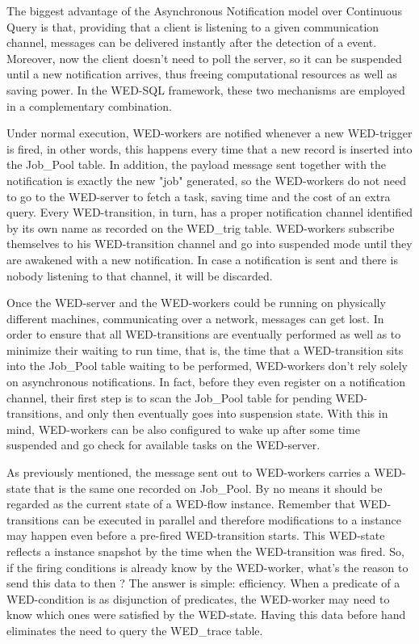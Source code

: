 \documentclass[12pt]{article}
\begin{document}
\par The biggest advantage of the Asynchronous Notification model over Continuous Query is that, providing that a client is 
listening to a given communication channel, messages can be delivered instantly after the detection of a event. Moreover,
now the client doesn't need to poll the server, so it can be suspended until a new notification arrives, thus freeing 
computational resources as well as saving power. In the WED-SQL framework, these two mechanisms are employed in a complementary
combination. 

\par Under normal execution, WED-workers are notified whenever a new WED-trigger is fired, in other words, this happens 
every time that a new record is inserted into the Job\_Pool table. In addition, the payload message sent together with
the notification is exactly the new "job" generated, so the WED-workers do not need to go to the WED-server to fetch a task,
saving time and the cost of an extra query. Every WED-transition, in turn, has a proper notification channel identified
by its own name as recorded on the WED\_trig table. WED-workers subscribe themselves to his WED-transition channel and 
go into suspended mode until they are awakened with a new notification. In case a notification is sent and there is nobody
listening to that channel, it will be discarded.  

\par Once the WED-server and the WED-workers could be running on physically different machines, communicating over a network, 
messages can get lost. In order to ensure that all WED-transitions are eventually performed as well as to minimize their waiting to run time,
that is, the time that a WED-transition sits into the Job\_Pool table waiting to be performed, WED-workers don't rely solely
on asynchronous notifications. In fact, before they even register on a notification channel, their first step is to scan
the Job\_Pool table for pending WED-transitions, and only then eventually goes into suspension state. With this in mind,
WED-workers can be also configured to wake up after some time suspended and go check for available tasks on the WED-server.

\par As previously mentioned, the message sent out to WED-workers carries a WED-state that is the same one recorded on Job\_Pool.
By no means it should be regarded as the current state of a WED-flow instance. Remember that WED-transitions can be executed
in parallel and therefore modifications to a instance may happen even before a pre-fired WED-transition starts. This WED-state
reflects a instance snapshot by the time when the WED-transition was fired. So, if the firing conditions is already know by 
the WED-worker, what's the reason to send this data to then ? The answer is simple: efficiency. When a predicate of a 
WED-condition is as disjunction of predicates, the WED-worker may need to know which ones were satisfied by the WED-state.
Having this data before hand eliminates the need to query the WED\_trace table.
\end{document}
